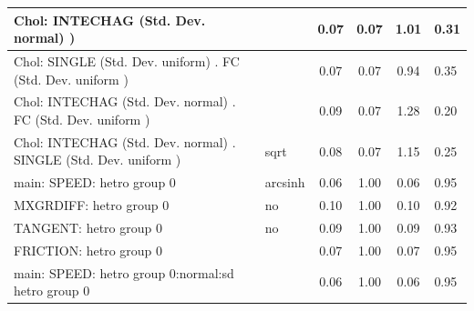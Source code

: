 \begin{table}
\begin{center}
\begin{tabular}{|l|l|c|c|c|l|}
			\hline
			 Chol: INTECHAG (Std. Dev. normal) ) &  & 0.07 & 0.07 & 1.01 & 0.31 \\
			\hline
			 Chol: SINGLE (Std. Dev. uniform) . FC (Std. Dev.   uniform ) &  & 0.07 & 0.07 & 0.94 & 0.35 \\
			\hline
			 Chol: INTECHAG (Std. Dev. normal) . FC (Std. Dev.   uniform ) &  & 0.09 & 0.07 & 1.28 & 0.20 \\
			\hline
			 Chol: INTECHAG (Std. Dev. normal) . SINGLE (Std. Dev.   uniform ) & sqrt & 0.08 & 0.07 & 1.15 & 0.25 \\
			\hline
			main: SPEED: hetro group 0 & arcsinh & 0.06 & 1.00 & 0.06 & 0.95 \\
			\hline
			MXGRDIFF: hetro group 0 & no & 0.10 & 1.00 & 0.10 & 0.92 \\
			\hline
			TANGENT: hetro group 0 & no & 0.09 & 1.00 & 0.09 & 0.93 \\
			\hline
			FRICTION: hetro group 0 &  & 0.07 & 1.00 & 0.07 & 0.95 \\
			\hline
			main: SPEED: hetro group 0:normal:sd  hetro group 0 &  & 0.06 & 1.00 & 0.06 & 0.95 \\
			\hline
		\end{tabular}
	\end{center}
\end{table}